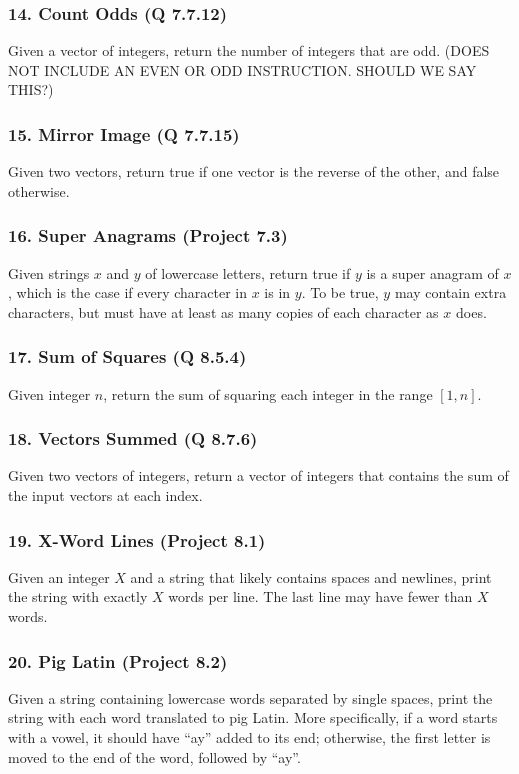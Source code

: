 \documentclass{sig-alternate}
\begin{document}
\subsubsection*{14. Count Odds (Q 7.7.12)}
Given a vector of integers, return the number of integers that are odd. (DOES NOT INCLUDE AN EVEN OR ODD INSTRUCTION. SHOULD WE SAY THIS?)

\subsubsection*{15. Mirror Image (Q 7.7.15)}
Given two vectors, return true if one vector is the reverse of the other, and false otherwise.

\subsubsection*{16. Super Anagrams (Project 7.3)}
Given strings $x$ and $y$ of lowercase letters, return true if $y$ is a super anagram of $x$, which is the case if every character in $x$ is in $y$. To be true, $y$ may contain extra characters, but must have at least as many copies of each character as $x$ does.

\subsubsection*{17. Sum of Squares (Q 8.5.4)}
Given integer $n$, return the sum of squaring each integer in the range $[1, n]$.

\subsubsection*{18. Vectors Summed (Q 8.7.6)}
Given two vectors of integers, return a vector of integers that contains the sum of the input vectors at each index.

\subsubsection*{19. X-Word Lines (Project 8.1)}
Given an integer $X$  and a string that likely contains spaces and newlines, print the string with exactly $X$ words per line. The last line may have fewer than $X$ words.

\subsubsection*{20. Pig Latin (Project 8.2)}
Given a string containing lowercase words separated by single spaces, print the string with each word translated to pig Latin. More specifically, if a word starts with a vowel, it should have ``ay'' added to its end; otherwise, the first letter is moved to the end of the word, followed by ``ay''.
\end{document}
